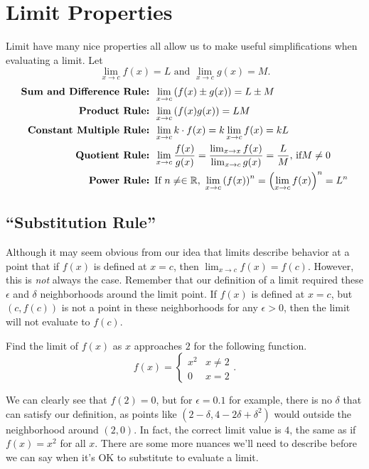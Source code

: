 \section{Limit Properties}
Limit have many nice properties all allow us to make useful simplifications when evaluating a limit.
Let
\begin{equation*}
	\lim_{x \to c}{f(x)} = L \text{ and } \lim_{x \to c}{g(x)} = M.
\end{equation*}
\begin{align*}
	\textbf{Sum and Difference Rule: }& \lim_{x\to c}{\left(f(x) \pm g(x)\right)} = L \pm M \\
	\textbf{Product Rule: }& \lim_{x\to c}{\left(f(x)g(x) \right)} = LM \\
	\textbf{Constant Multiple Rule: }& \lim_{x \to c}{k\cdot f(x)} = k \lim_{x \to c}{f(x)} = kL \\
	\textbf{Quotient Rule: }& \lim_{x \to c}{\frac{f(x)}{g(x)}} = \frac{\lim_{x \to x}{f(x)}}{\lim_{x \to c}{g(x)}} = \frac{L}{M} \text{, if} M \neq 0 \\
	\textbf{Power Rule: }& \text{If } n \neq  \in \mathbb{R} \text{, } \lim_{x\to c}{\left(f(x)\right)^n} = \left(\lim_{x \to c}{f(x)}\right)^n = L^n
\end{align*}

\subsection{``Substitution Rule''}
Although it may seem obvious from our idea that limits describe behavior at a point that if $f(x)$ is defined at $x=c$, then $\lim_{x\to c}{f(x)} = f(c)$.
However, this is \textit{not} always the case.
Remember that our definition of a limit required these $\epsilon$ and $\delta$ neighborhoods around the limit point.
If $f(x)$ is defined at $x=c$, but $(c, f(c))$ is not a point in these neighborhoods for any $\epsilon > 0$, then the limit will not evaluate to $f(c)$.

\begin{example}
	Find the limit of $f(x)$ as $x$ approaches $2$ for the following function.
	\begin{equation*}
		f(x) = \begin{cases}
			x^2 & x \neq 2 \\
			0 & x = 2
		\end{cases}.
	\end{equation*}
\end{example}
We can clearly see that $f(2) =  0$, but for $\epsilon = 0.1$ for example, there is no $\delta$ that can satisfy our definition, as points like $(2 - \delta, 4 - 2\delta + \delta^2)$ would outside the neighborhood around $(2,0)$.
In fact, the correct limit value is $4$, the same as if $f(x) = x^2$ for all $x$.
There are some more nuances we'll need to describe before we can say when it's OK to substitute to evaluate a limit.